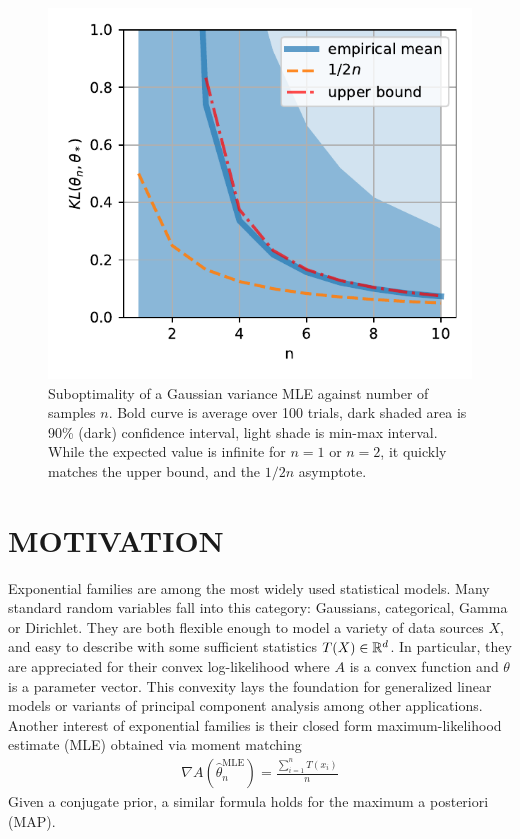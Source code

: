 \documentclass[twoside]{article}
\let\oldsection\section
\renewcommand{\section}[1]{\oldsection{\texorpdfstring{\uppercase{#1}}{#1}}}
\newcommand{\cond}{\,\vert\,}
\newcommand{\logpart}{A}
\newcommand{\nat}{\theta}
\newcommand{\lin}[1]{\left\langle#1\right\rangle}
\begin{document}
\begin{figure}[t]
	\centering
\includegraphics[width=.4\textwidth]{fewsamples.pdf}
	\caption{Suboptimality of a Gaussian variance MLE against number of samples $n$. Bold curve is average over 100 trials,  dark shaded area is 90\% (dark) confidence interval, light shade is min-max interval.
		While the expected value is infinite for $n=1$ or $n=2$, it quickly matches the upper bound, and the $1/2n$ asymptote.
	}
	\label{fig:curves}
\end{figure}


\section{Motivation}

Exponential families are among the most widely used statistical models.
Many standard random variables fall into this category: Gaussians, categorical, Gamma or Dirichlet.
They are both flexible enough to model a variety of data sources $X$, and easy to describe with some sufficient statistics $T(X) \in \mathbb{R}^d$.
In particular, they are appreciated for their convex log-likelihood
\alignn{
f(\nat) = \E[-\log p(X \cond \nat)] = \logpart(\nat) - \lin{\E[T(X)] , \nat}
\label{eq:defNLL}
}
where $\logpart$ is a convex function and $\nat$ is a parameter vector.
This convexity lays the foundation for generalized linear models \citep{mccullagh1989generalized} 
or variants of principal component analysis \citep{collins2001generalization} among other applications.
Another interest of exponential families is their closed form maximum-likelihood estimate (MLE) obtained via moment matching
\begin{align}
	\nabla \logpart(\hat \nat_n^\text{MLE}) = \frac{\sum_{i=1}^n T(x_i)}{n} 
	\label{eq:defMLE}
\end{align}
Given a conjugate prior, a similar formula holds for the maximum a posteriori (MAP).
\end{document}

